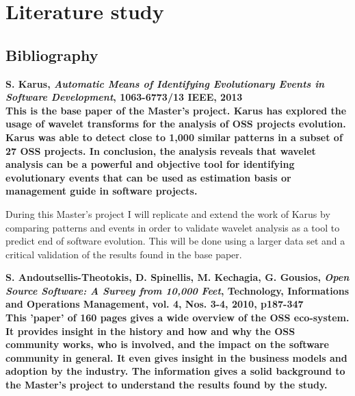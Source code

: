 \section{Literature study}

\subsection{Bibliography}

\begingroup
\renewcommand{\section}[2]{}%

\begin{thebibliography}{99}
	 \bfseries{S. Karus, \emph{Automatic Means of
		Identifying Evolutionary Events in Software Development}, 1063-6773/13 IEEE,
		2013}\rm
		\\
		
		This is the base paper of the Master's project.
		Karus has explored the usage of wavelet transforms for the analysis of OSS
		projects evolution. Karus was able to detect close to 1,000 similar patterns
		in a subset of 27 OSS projects. In conclusion, the analysis reveals that
		wavelet analysis can be a powerful and objective tool for identifying
		evolutionary events that can be used as estimation basis or management guide
		in software projects.

		During this Master's project I will replicate and extend the work of Karus by
		comparing patterns and events in order to validate wavelet analysis as a tool
		to predict end of software evolution. This will be done using a larger data
		set and a critical validation of the results found in the base paper.

	 \bfseries{S. Andoutsellis-Theotokis, D. Spinellis, M.
		Kechagia, G. Gousios, \emph{Open Source Software: A Survey from 10,000
		Feet}, Technology, Informations and Operations Management, vol. 4, Nos.
		3-4, 2010, p187-347}\rm
		\\
		
		This 'paper' of 160 pages gives a wide overview of the OSS eco-system. It
		provides insight in the history and how and why the OSS community works, who
		is involved, and the impact on the software community in general. It even
		gives insight in the business models and adoption by the industry. The
		information gives a solid background to the Master's project to understand
		the results found by the study.


\end{thebibliography}
